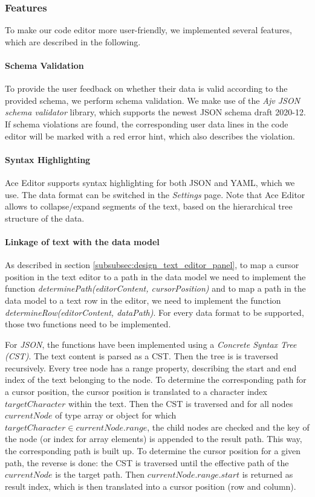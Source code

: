\subsubsection{Features}

To make our code editor more user-friendly, we implemented several features, which are described in the following.

\paragraph{Schema Validation}
To provide the user feedback on whether their data is valid according to the provided schema, we perform schema validation.
We make use of the \textit{Ajv JSON schema validator}\cite{ajv-validator} library, which supports the newest JSON schema draft 2020-12.
If schema violations are found, the corresponding user data lines in the code editor will be marked with a red error hint, which also describes the violation.


\paragraph{Syntax Highlighting}
Ace Editor supports syntax highlighting for both JSON and YAML, which we use.
The data format can be switched in the \textit{Settings} page.
Note that Ace Editor allows to collapse/expand segments of the text, based on the hierarchical tree structure of the data.

\paragraph{Linkage of text with the data model}
As described in section \ref{subsubsec:design_text_editor_panel}, to map a cursor position in the text editor to a path in the data model we need to implement the function \textit{determinePath(editorContent, cursorPosition)} and to map a path in the data model to a text row in the editor, we need to implement the function \textit{determineRow(editorContent, dataPath)}. For every data format to be supported, those two functions need to be implemented.

For \textit{JSON}, the functions have been implemented using a \textit{Concrete Syntax Tree (CST)}.
The text content is parsed as a CST. Then the tree is is traversed recursively.
Every tree node has a range property, describing the start and end index of the text belonging to the node.
To determine the corresponding path for a cursor position, the cursor position is translated to a character index $targetCharacter$ within the text.
Then the CST is traversed and for all nodes $currentNode$ of type array or object for which $targetCharacter \in currentNode.range$,
the child nodes are checked and the key of the node (or index for array elements) is appended to the result path.
This way, the corresponding path is built up.
To determine the cursor position for a given path, the reverse is done: the CST is traversed until the effective path of the $currentNode$ is the target path. Then $currentNode.range.start$ is returned as result index, which is then translated into a cursor position (row and column).

